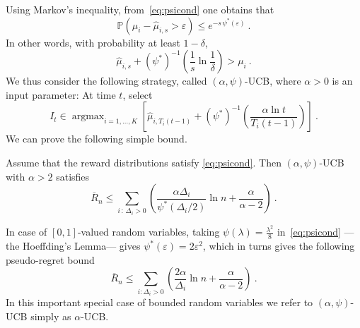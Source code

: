 \documentclass[11pt]{hackednow}
\renewcommand{\P}{\mathbb{P}}
\newcommand{\oR}{\overline{R}}
\renewcommand{\epsilon}{\varepsilon}
\newcommand{\wh}{\widehat}
\newcommand{\argmax}{\mathop{\mathrm{argmax}}}
\begin{document}
Using Markov's inequality, from~\eqref{eq:psicond} one obtains that
\begin{equation} \label{eq:psiconcentration}
\P(\mu_i - \wh{\mu}_{i,s} > \epsilon) \leq e^{- s\,\psi^*(\epsilon)}~.
\end{equation}
In other words, with probability at least $1- \delta$,
$$\wh{\mu}_{i,s} + \left(\psi^*\right)^{-1}\left( \frac{1}{s}\ln\frac{1}{\delta}\right) > \mu_i~.$$
We thus consider the following strategy, called $(\alpha, \psi)$-UCB, where $\alpha >0$ is an input parameter: At time $t$, select
\[
I_t \in \argmax_{i=1,\hdots,K} \left[ \wh{\mu}_{i,T_i(t-1)} + \left(\psi^*\right)^{-1}\left( \frac{\alpha \ln t}{T_i(t-1)}\right) \right]~.
\]
We can prove the following simple bound.
%
\begin{theorem} \label{th:ucb}
Assume that the reward distributions satisfy \eqref{eq:psicond}. Then $(\alpha, \psi)$-UCB with $\alpha > 2$ satisfies
$$\oR_n \leq \sum_{i \,:\, \Delta_i > 0} \left( \frac{\alpha \Delta_i}{\psi^*(\Delta_i / 2)} \ln n + \frac{\alpha}{\alpha - 2}  \right)~.$$
\end{theorem}
In case of $[0,1]$-valued random variables, taking $\psi(\lambda) = \tfrac{\lambda^2}{8}$ in~\eqref{eq:psicond} ---the Hoeffding's Lemma--- gives $\psi^*(\epsilon) = 2 \epsilon^2$, which in turns gives the following pseudo-regret bound
\begin{equation} \label{eq:regretUCBbounded}
\oR_n \leq \sum_{i : \Delta_i > 0} \left( \frac{2 \alpha}{\Delta_i} \ln n + \frac{\alpha}{\alpha - 2}  \right)~.
\end{equation}
In this important special case of bounded random variables we refer to $(\alpha,\psi)$-UCB simply as $\alpha$-UCB.
%
\end{document}
